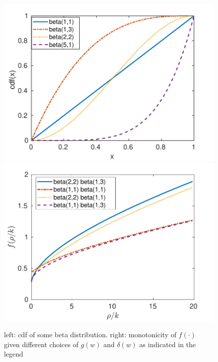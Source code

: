\documentclass{aims}
\numberwithin{equation}{section}
\begin{document}
\begin{figure}
\begin{center}
\includegraphics[scale=0.5]{plots/frhok/betas-new}\includegraphics[scale=0.5]{plots/frhok/frhok-new}
\end{center}
\caption{\label{fig:beta =000026 f}left: cdf of some beta distribution. right:
monotonicity of $f(\cdot)$ given different choices of $g(w)$ and
$\delta(w)$ as indicated in the legend}
\end{figure}
\end{document}
